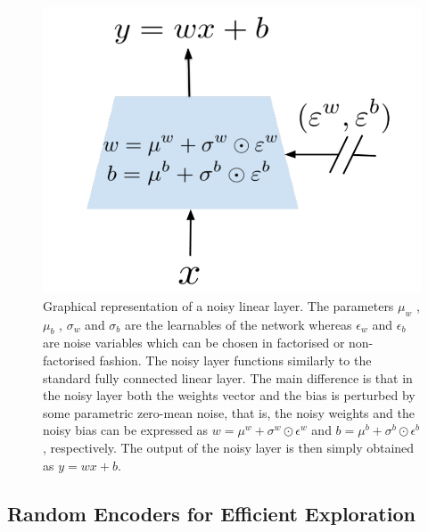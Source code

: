 \documentclass{article}
\begin{document}
\begin{figure} [!ht]
	\centering
	\includegraphics[width=0.35\linewidth]{figure/NoiseNet.png}
	\caption{Graphical representation of a noisy linear layer. The parameters $\mu_w$ , $\mu_b$ , $\sigma_w$ and $\sigma_b$ are the learnables of the network whereas $\epsilon_w$ and $\epsilon_b$ are noise variables which can be chosen in factorised or non-factorised fashion. The noisy layer functions similarly to the standard fully connected linear layer. The main difference is that in the noisy layer both the weights vector and the bias is perturbed by some parametric zero-mean noise, that is, the noisy weights and the noisy bias can be expressed as $w = \mu^w+\sigma^w \odot \epsilon^w$ and $b = \mu^b + \sigma^b \odot \epsilon^b$, respectively. The output of the noisy layer is then simply obtained as $y = wx + b$.}
	\label{fig:enter-label}
\end{figure}
\subsection{Random Encoders for Efficient Exploration}
\end{document}
